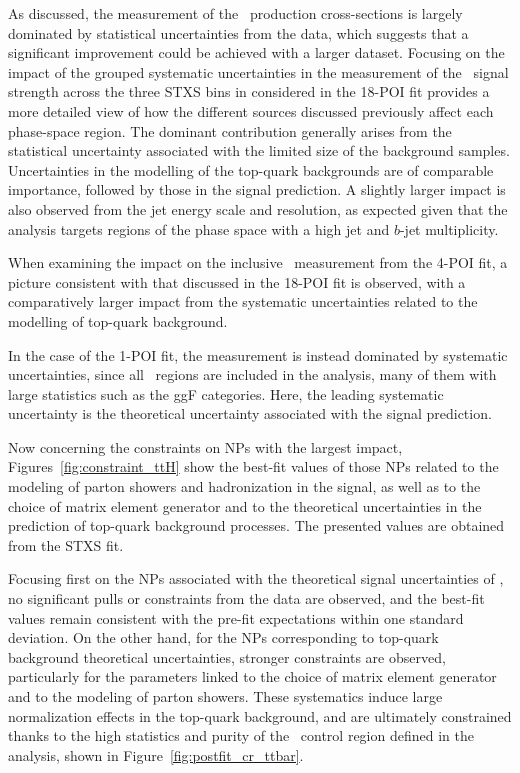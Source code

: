 As discussed, the measurement of the \ttH\ production cross-sections is largely dominated by statistical uncertainties from the data, 
which suggests that a significant improvement could be achieved with a larger dataset. 
Focusing on the impact of the grouped systematic uncertainties in the measurement of the \ttH\ signal strength across the three STXS bins in \pth considered in the 18-POI fit provides a more detailed view of how the different sources discussed previously affect each phase-space region. 
The dominant contribution generally arises from the statistical uncertainty associated with the limited size of the background samples. Uncertainties in the modelling of the top-quark backgrounds are of comparable importance, followed by those in the signal prediction. 
A slightly larger impact is also observed from the jet energy scale and resolution, as expected given that the analysis targets regions of the phase space with a high jet and $b$-jet multiplicity.

When examining the impact on the inclusive \ttH\ measurement from the 4-POI fit, a picture consistent with that discussed in the 18-POI fit is observed, with a comparatively larger impact from the systematic uncertainties related to the modelling of top-quark background.

In the case of the 1-POI fit, the measurement is instead dominated by systematic uncertainties, 
since all \htautau\ regions are included in the analysis, many of them with large statistics such as the ggF categories. 
Here, the leading systematic uncertainty is the theoretical uncertainty associated with the signal prediction.

Now concerning the constraints on NPs with the largest impact, 
Figures~\ref{fig:constraint_ttH} show the best-fit values of those NPs related to the modeling of parton showers and hadronization in the signal, 
as well as to the choice of matrix element generator and to the theoretical uncertainties in the prediction of top-quark background processes. 
The presented values are obtained from the STXS fit. 

Focusing first on the NPs associated with the theoretical signal uncertainties of \ttH, no significant pulls or constraints from the data are observed, 
and the best-fit values remain consistent with the pre-fit expectations within one standard deviation. 
On the other hand, for the NPs corresponding to top-quark background theoretical uncertainties,
stronger constraints are observed, particularly for the parameters linked to the choice of matrix element generator and to the modeling of parton showers. 
These systematics induce large normalization effects in the top-quark background, and are ultimately constrained thanks to the high statistics and purity of the \ttbar\ control region defined in the analysis, shown in Figure~\ref{fig:postfit_cr_ttbar}.

